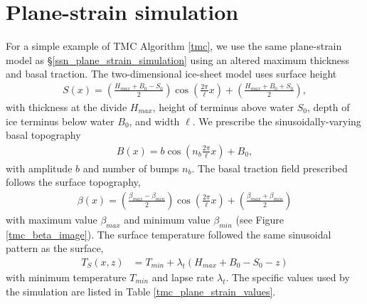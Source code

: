 

\section{Plane-strain simulation} \label{ssn_tmc_plane_strain_simulation}

For a simple example of TMC Algorithm \ref{tmc}, we use the same plane-strain model as \S \ref{ssn_plane_strain_simulation} using an altered maximum thickness and basal traction.  The two-dimensional ice-sheet model uses surface height 
{\small
\begin{align*}
  S(x) = \left( \frac{ H_{max} + B_0 - S_0 }{2} \right) \cos\left( \frac{2\pi}{\ell} x \right) + \left( \frac{H_{max} + B_0 + S_0}{2} \right),
\end{align*}}
with thickness at the divide $H_{max}$, height of terminus above water $S_0$, depth of ice terminus below water $B_0$, and width $\ell$.  We prescribe the sinusoidally-varying basal topography
\begin{align*}
  B(x) = b \cos\left( n_b \frac{2\pi}{\ell} x \right) + B_0,
\end{align*}
with amplitude $b$ and number of bumps $n_b$.  The basal traction field prescribed follows the surface topography,
\begin{align*}
  \beta(x) = \left( \frac{\beta_{max} - \beta_{min}}{2} \right) \cos\left( \frac{2\pi}{\ell} x \right) + \left( \frac{\beta_{max} + \beta_{min}}{2} \right)
\end{align*}
with maximum value $\beta_{max}$ and minimum value $\beta_{min}$ (see Figure \ref{tmc_beta_image}).  The surface temperature followed the same sinusoidal pattern as the surface,
\begin{align*}
  T_S(x,z) &= T_{min} + \lambda_t (H_{max} + B_0 - S_0 - z)
\end{align*}
with minimum temperature $T_{min}$ and lapse rate $\lambda_t$.  The specific values used by the simulation are listed in Table \ref{tmc_plane_strain_values}.

